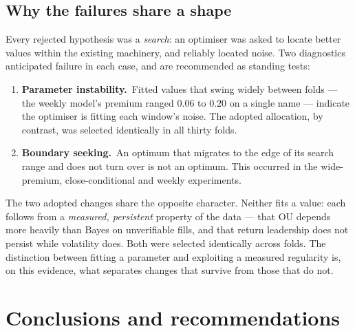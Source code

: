\documentclass[11pt]{article}
\newcommand{\kpi}[2]{\textbf{#1}\,{\footnotesize\color{bcgrey}#2}}
\begin{document}
\subsection{Why the failures share a shape}

Every rejected hypothesis was a \emph{search}: an optimiser was asked to locate better values
within the existing machinery, and reliably located noise. Two diagnostics anticipated failure
in each case, and are recommended as standing tests:

\begin{enumerate}[leftmargin=1.5em,itemsep=2pt]
  \item \kpi{Parameter instability.}{} Fitted values that swing widely between folds --- the
        weekly model's premium ranged $0.06$ to $0.20$ on a single name --- indicate the
        optimiser is fitting each window's noise. The adopted allocation, by contrast, was
        selected identically in all thirty folds.
  \item \kpi{Boundary seeking.}{} An optimum that migrates to the edge of its search range and
        does not turn over is not an optimum. This occurred in the wide-premium, close-conditional
        and weekly experiments.
\end{enumerate}

The two adopted changes share the opposite character. Neither fits a value: each follows from a
\emph{measured, persistent} property of the data --- that OU depends more heavily than Bayes on
unverifiable fills, and that return leadership does not persist while volatility does. Both were
selected identically across folds. The distinction between fitting a parameter and exploiting a
measured regularity is, on this evidence, what separates changes that survive from those that
do not.

\section{Conclusions and recommendations}
\end{document}
